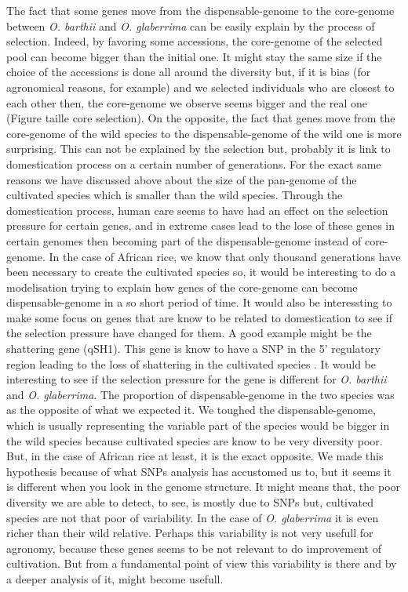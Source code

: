 \documentclass[10pt,letterpaper]{article}
\begin{document}
The fact that some genes move from the dispensable-genome to the core-genome between \emph{O. barthii} and \emph{O. glaberrima} can be easily explain by the process of selection. Indeed, by favoring some accessions, the core-genome of the selected pool can become bigger than the initial one. It might stay the same size if the choice of the accessions is done all around the diversity but, if it is bias (for agronomical reasons, for example) and we selected individuals who are closest to each other then, the core-genome we observe seems bigger and the real one (Figure taille core selection). 
On the opposite, the fact that genes move from the core-genome of the wild species to the dispensable-genome of the wild one is more surprising. This can not be explained by the selection but, probably it is link to domestication process on a certain number of generations. For the exact same reasons we have discussed above about the size of the pan-genome of the cultivated species which is smaller than the wild species. Through the domestication process, human care seems to have had an effect on the selection pressure for certain genes, and in extreme cases lead to the lose of these genes in certain genomes then becoming part of the dispensable-genome instead of core-genome. In the case of African rice, we know that only thousand generations have been necessary to create the cultivated species so, it would be interesting to do a modelisation trying to explain how genes of the core-genome can become dispensable-genome in a so short period of time. It would also be interessting to make some focus on genes that are know to be related to domestication to see if the selection pressure have changed for them. A good example might be the shattering gene (qSH1). This gene is know to have a SNP in the 5' regulatory region leading to the loss of shattering in the cultivated species \cite{Konishi2006}. It would be interesting to see if the selection pressure for the gene is different for \emph{O. barthii} and \emph{O. glaberrima}.
The proportion of dispensable-genome in the two species was as the opposite of what we expected it. We toughed the dispensable-genome, which is usually representing the variable part of the species would be bigger in the wild species because cultivated species are know to be very diversity poor. But, in the case of African rice at least, it is the exact opposite. We made this hypothesis because of what SNPs analysis has accustomed us to, but it seems it is different when you look in the genome structure. It might means that, the poor diversity we are able to detect, to see, is mostly due to SNPs but, cultivated species are not that poor of variability. In the case of \emph{O. glaberrima} it is even richer than their wild relative. Perhaps this variability is not very usefull for agronomy, because these genes seems to be not relevant to do improvement of cultivation. But from a fundamental point of view this variability is there and by a deeper analysis of it, might become usefull. 
\end{document}

